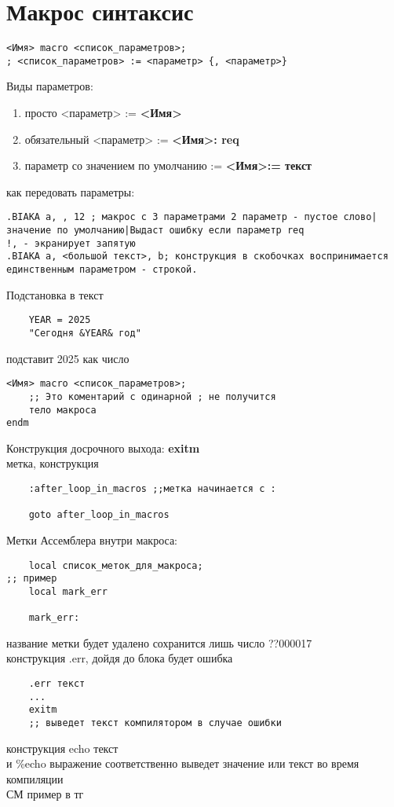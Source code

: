 \documentclass[a4paper, 12pt]{article}
\begin{document}
\section*{Макрос синтаксис}
\begin{lstlisting}
<Имя> macro <список_параметров>;
; <список_параметров> := <параметр> {, <параметр>} 
\end{lstlisting}
Виды параметров:
\begin{enumerate}
    \item просто <параметр> := \textbf{<Имя>}
    \item обязательный <параметр> :=  \textbf{<Имя>: req}
    \item параметр со значением по умолчанию := \textbf{<Имя>:= текст}
\end{enumerate}
как передовать параметры: \\
\begin{lstlisting}
.BIAKA a, , 12 ; макрос с 3 параметрами 2 параметр - пустое слово|значение по умолчанию|Выдаст ошибку если параметр req
!, - экранирует запятую
.BIAKA a, <большой текст>, b; конструкция в скобочках воспринимается единственным параметром - строкой.
\end{lstlisting}
Подстановка в текст \\
\begin{lstlisting}
    YEAR = 2025
    "Сегодня &YEAR& год"
\end{lstlisting}
подставит 2025 как число \\
\begin{lstlisting}
<Имя> macro <список_параметров>;
    ;; Это коментарий с одинарной ; не получится
    тело макроса
endm
\end{lstlisting}
Конструкция досрочного выхода: \textbf{exitm} \\
метка, конструкция
\begin{lstlisting}
    :after_loop_in_macros ;;метка начинается с :

    goto after_loop_in_macros
\end{lstlisting}
Метки Ассемблера внутри макроса:
\begin{lstlisting}
    local список_меток_для_макроса;
;; пример 
    local mark_err

    mark_err:
\end{lstlisting}
название метки будет удалено сохранится лишь число ??000017\\
конструкция .err, дойдя до блока будет ошибка\\
\begin{lstlisting}
    .err текст
    ...
    exitm
    ;; выведет текст компилятором в случае ошибки
\end{lstlisting}
конструкция echo текст\\
и \%echo выражение
соответственно выведет значение или текст во время компиляции \\
СМ пример в тг
\end{document}
